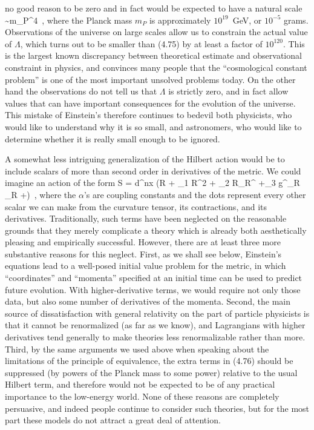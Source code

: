 no good reason to be zero and in fact would be expected to have
a natural scale
\be
  \Lambda \sim m_P^4\ ,\label{4.75}
\ee
where the Planck mass $m_P$ is approximately $10^{19}$~GeV, or
$10^{-5}$ grams.  Observations of the universe on large scales 
allow us to constrain the actual value of $\Lambda$, which turns
out to be smaller than (4.75) by at least a factor of $10^{120}$.
This is the largest known discrepancy between theoretical estimate
and observational constraint in physics, and convinces many people
that the ``cosmological constant problem'' is one of the most
important unsolved problems today.  On the other hand the 
observations do not tell us that $\Lambda$ is strictly zero, and
in fact allow values that can have important consequences for the
evolution of the universe.  This mistake of Einstein's therefore
continues to bedevil both physicists, who would like to understand
why it is so small, and astronomers, who would like to determine
whether it is really small enough to be ignored.

A somewhat less intriguing generalization of the Hilbert action would
be to include scalars of more than second order in derivatives of
the metric.  We could imagine an action of the form
\be
  S = \int d^nx \g (R + \alpha_1 R^2 + \alpha_2 R_\mn R^\mn
  +\alpha_3 g^\mn \nabla_\mu R \nabla_\nu R +\cdots)\ ,\label{4.76}
\ee
where the $\alpha$'s are coupling constants and the dots represent
every other scalar we can make from the curvature tensor, its 
contractions, and its derivatives.  Traditionally, such terms have
been neglected on the reasonable grounds that they merely complicate
a theory which is already both aesthetically pleasing and empirically
successful.  However, there are at least three more substantive reasons 
for this neglect.  First, as we shall see below, Einstein's equations
lead to a well-posed initial value problem for the metric, in which
``coordinates'' and ``momenta'' specified at an initial time can be
used to predict future evolution.  With higher-derivative terms, we
would require not only those data, but also some number of derivatives
of the momenta.  Second, the main source of dissatisfaction with 
general relativity on the part of particle physicists is that it cannot
be renormalized (as far as we know), and Lagrangians with higher 
derivatives tend generally to make theories less renormalizable rather
than more.  Third, by the same arguments we used above when speaking
about the limitations of the principle of equivalence, the extra terms
in (4.76) should be suppressed (by powers of the Planck mass to some
power) relative to the usual Hilbert term, and therefore would not be
expected to be of any practical importance to the low-energy world.
None of these reasons are completely persuasive, and indeed people
continue to consider such theories, but for the most part these models
do not attract a great deal of attention.

